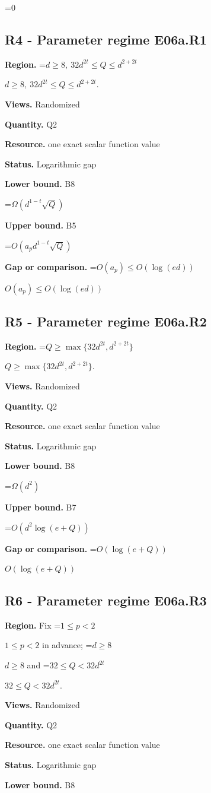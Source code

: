 \documentclass[10pt,a4paper]{article}
\newcommand{\AtlasMath}[1]{\par\begingroup\centering\setbox0=\hbox{$\displaystyle #1$}\ifdim\wd0>1.4\linewidth\typeout{ATLAS WIDE FORMULA: \the\wd0}\fi\ifdim\wd0>\linewidth\resizebox{\linewidth}{!}{\box0}\else\box0\fi\par\endgroup}
\newcommand{\AtlasInlineMath}[1]{\begingroup\setbox0=\hbox{$#1$}\ifdim\wd0>.4\linewidth\endgroup\AtlasMath{#1}\else\endgroup$#1$\fi}
\begin{document}
\AtlasMath{0}
\subsection{R4 - Parameter regime E06a.R1}
\textbf{Region.} \AtlasInlineMath{d\ge8,\ 32d^{2t}\le Q\le d^{2+2t}}.

\textbf{Views.} Randomized

\textbf{Quantity.} Q2

\textbf{Resource.} one exact scalar function value

\textbf{Status.} Logarithmic gap

\textbf{Lower bound.} B8

\AtlasMath{\Omega(d^{1-t}\sqrt Q)}
\textbf{Upper bound.} B5

\AtlasMath{O(a_p d^{1-t}\sqrt Q)}
\textbf{Gap or comparison.} \AtlasInlineMath{O(a_p)\le O(\log(ed))}

\subsection{R5 - Parameter regime E06a.R2}
\textbf{Region.} \AtlasInlineMath{Q\ge\max\{32d^{2t},d^{2+2t}\}}.

\textbf{Views.} Randomized

\textbf{Quantity.} Q2

\textbf{Resource.} one exact scalar function value

\textbf{Status.} Logarithmic gap

\textbf{Lower bound.} B8

\AtlasMath{\Omega(d^2)}
\textbf{Upper bound.} B7

\AtlasMath{O(d^2\log(e+Q))}
\textbf{Gap or comparison.} \AtlasInlineMath{O(\log(e+Q))}

\subsection{R6 - Parameter regime E06a.R3}
\textbf{Region.} Fix \AtlasInlineMath{1\le p<2} in advance; \AtlasInlineMath{d\ge8} and \AtlasInlineMath{32\le Q<32d^{2t}}.

\textbf{Views.} Randomized

\textbf{Quantity.} Q2

\textbf{Resource.} one exact scalar function value

\textbf{Status.} Logarithmic gap

\textbf{Lower bound.} B8
\end{document}
